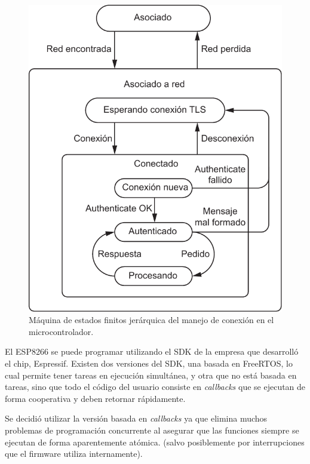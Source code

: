 \begin{figure}[ht!]
	\begin{center}
		\centering
		\includegraphics[scale=0.8]{imagenes/fsm-micro.pdf}
		\caption{Máquina de estados finitos jerárquica del manejo de conexión en el microcontrolador.}
		\label{fig:fsm-micro}
	\end{center}
\end{figure}

El ESP8266 se puede programar utilizando el SDK de la empresa que desarrolló el chip, Espressif. Existen dos versiones del SDK, una basada en FreeRTOS, lo cual permite tener tareas en ejecución simultánea, y otra que no está basada en tareas, sino que todo el código del usuario consiste en \emph{callbacks} que se ejecutan de forma cooperativa y deben retornar rápidamente.

Se decidió utilizar la versión basada en \emph{callbacks} ya que elimina muchos problemas de programación concurrente al asegurar que las funciones siempre se ejecutan de forma aparentemente atómica. (salvo posiblemente por interrupciones que el firmware utiliza internamente).

